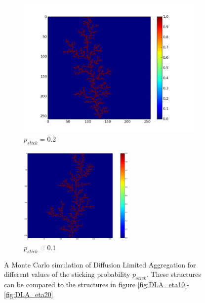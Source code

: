 \documentclass[a4paper]{article}
\begin{document}
\begin{figure}
  \begin{subfigure}[b]{0.5\linewidth}
    \centering
    \includegraphics[width=\linewidth, trim={1cm 0.9cm 3.07cm 0cm},clip]{mcDLA_02.png}
    \caption{$p_{stick} = 0.2$} 
    \label{fig:mcDLA_02} 
  \end{subfigure}%
  \begin{subfigure}[b]{0.5\linewidth}
    \centering
    \includegraphics[width=5.6cm]{mcDLA_01.png}
    \caption{$p_{stick} = 0.1$} 
    \label{fig:mcDLA_01} 
  \end{subfigure}
  \caption{A Monte Carlo simulation of Diffusion Limited Aggregation for different values of the sticking probability $p_{stick}$. These structures can be compared to the structures in figure \ref{fig:DLA_eta10}-\ref{fig:DLA_eta20}}
  \label{fig:mcDLA} 
\end{figure}
\end{document}
